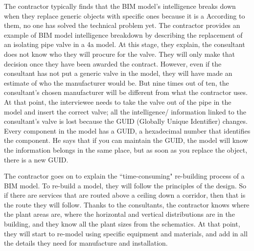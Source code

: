The contractor typically finds that 
the BIM model's intelligence breaks down
when they replace generic objects with specific ones
because it is a 
According to them, no one has solved the technical problem yet.
The contractor provides an example of BIM model intelligence breakdown by describing the replacement of an isolating pipe valve in a 4a model.
At this stage, they explain, the consultant does not know who they will procure for the valve.
They will only make that decision once they have been awarded the contract.
However, even if the consultant has not put a generic valve in the model, they will have made an estimate of who the manufacturer would be.
But nine times out of ten, the consultant's chosen manufacturer will be different from what the contractor uses.
At that point, the interviewee needs to take the valve out of the pipe in the model and insert the correct valve; all the intelligence/ information linked to the consultant's valve is lost because the GUID (Globally Unique Identifier)
changes.
Every component in the model has a GUID, a hexadecimal number
that identifies the component.
He says that if you can maintain the GUID, the model will know the information belongs in the same place, but as soon as you replace the object, there is a new GUID. %


The contractor goes on to explain the ``time-consuming" re-building process of a BIM model.
To re-build a model, they will follow the principles of the design.
So if there are services that are routed above a ceiling down a corridor, then that is the route they will follow.
Thanks to the consultants, the contractor knows where the plant areas are, where the horizontal and vertical distributions are in the building, and they know all the plant sizes from the schematics.
At that point, they will start to re-model using specific equipment and materials, and add in all the details they need for manufacture and installation.

